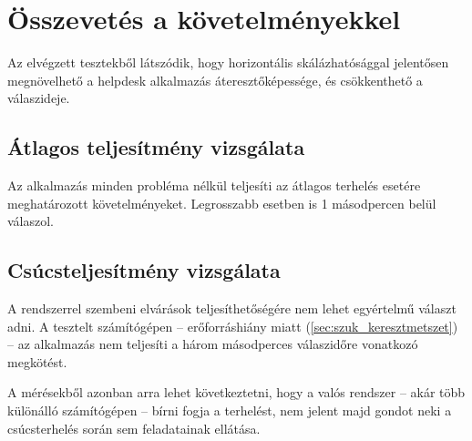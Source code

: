 \pagebreak

\section{Összevetés a követelményekkel}
Az elvégzett tesztekből látszódik, hogy horizontális skálázhatósággal jelentősen megnövelhető a helpdesk alkalmazás áteresztőképessége, és csökkenthető a válaszideje.

\subsection{Átlagos teljesítmény vizsgálata}
Az alkalmazás minden probléma nélkül teljesíti az átlagos terhelés esetére meghatározott követelményeket. Legrosszabb esetben is 1 másodpercen belül válaszol.

\subsection{Csúcsteljesítmény vizsgálata}
A rendszerrel szembeni elvárások teljesíthetőségére nem lehet egyértelmű választ adni. A tesztelt számítógépen --  erőforráshiány miatt (\ref{sec:szuk_keresztmetszet}) --   az alkalmazás nem teljesíti a három másodperces válaszidőre vonatkozó megkötést.

A mérésekből azonban arra lehet következtetni, hogy a valós rendszer --  akár több különálló számítógépen --   bírni fogja a terhelést, nem jelent majd gondot neki a csúcsterhelés során sem feladatainak ellátása.




